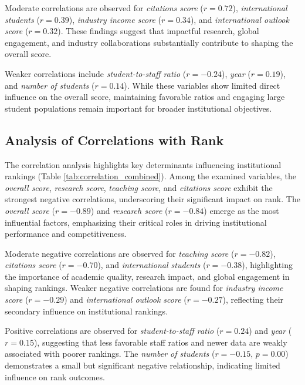 \documentclass[conference]{IEEEtran}
\begin{document}
Moderate correlations are observed for \textit{citations score} ($r = 0.72$), \textit{international students} ($r = 0.39$), \textit{industry income score} ($r = 0.34$), and \textit{international outlook score} ($r = 0.32$). These findings suggest that impactful research, global engagement, and industry collaborations substantially contribute to shaping the overall score.

Weaker correlations include \textit{student-to-staff ratio} ($r = -0.24$), \textit{year} ($r = 0.19$), and \textit{number of students} ($r = 0.14$). While these variables show limited direct influence on the overall score, maintaining favorable ratios and engaging large student populations remain important for broader institutional objectives.








\subsection{Analysis of Correlations with Rank}

The correlation analysis highlights key determinants influencing institutional rankings (Table \ref{tab:correlation_combined}). Among the examined variables, the \textit{overall score}, \textit{research score}, \textit{teaching score}, and \textit{citations score} exhibit the strongest negative correlations, underscoring their significant impact on rank. The \textit{overall score} ($r = -0.89$) and \textit{research score} ($r = -0.84$) emerge as the most influential factors, emphasizing their critical roles in driving institutional performance and competitiveness.

Moderate negative correlations are observed for \textit{teaching score} ($r = -0.82$), \textit{citations score} ($r = -0.70$), and \textit{international students} ($r = -0.38$), highlighting the importance of academic quality, research impact, and global engagement in shaping rankings. Weaker negative correlations are found for \textit{industry income score} ($r = -0.29$) and \textit{international outlook score} ($r = -0.27$), reflecting their secondary influence on institutional rankings.

Positive correlations are observed for \textit{student-to-staff ratio} ($r = 0.24$) and \textit{year} ($r = 0.15$), suggesting that less favorable staff ratios and newer data are weakly associated with poorer rankings. The \textit{number of students} ($r = -0.15$, $p = 0.00$) demonstrates a small but significant negative relationship, indicating limited influence on rank outcomes.
\end{document}
